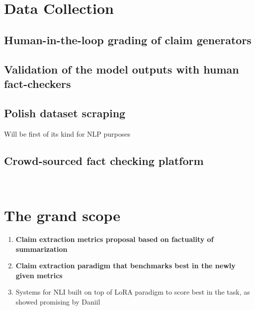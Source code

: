 \section{Data Collection}
\subsection{Human-in-the-loop grading of claim generators}
\subsection{Validation of the model outputs with human fact-checkers}
\subsection{Polish dataset scraping}
Will be first of its kind for NLP purposes

\subsection{Crowd-sourced fact checking platform}
~\cite{butora}
\section{The grand scope}
\begin{enumerate}
    \item \textbf{Claim extraction metrics proposal based on factuality of summarization}
    \item \textbf{Claim extraction paradigm that benchmarks best in the newly given metrics}
    \item Systems for NLI built on top of LoRA paradigm to score best in the task, as showed promising by Daniil
    
\end{enumerate}